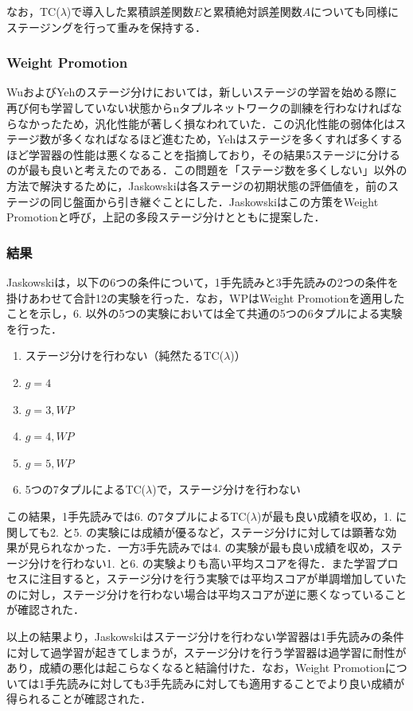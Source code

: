 \documentclass{suribt}
\begin{document}
なお，TC(${\lambda}$)で導入した累積誤差関数$E$と累積絶対誤差関数$A$についても同様にステージングを行って重みを保持する．

\subsubsection{Weight Promotion}
WuおよびYehのステージ分けにおいては，新しいステージの学習を始める際に再び何も学習していない状態からnタプルネットワークの訓練を行わなければならなかったため，汎化性能が著しく損なわれていた．この汎化性能の弱体化はステージ数が多くなればなるほど進むため，Yehはステージを多くすれば多くするほど学習器の性能は悪くなることを指摘しており，その結果5ステージに分けるのが最も良いと考えたのである．この問題を「ステージ数を多くしない」以外の方法で解決するために，Jaskowskiは各ステージの初期状態の評価値を，前のステージの同じ盤面から引き継ぐことにした．Jaskowskiはこの方策をWeight Promotionと呼び，上記の多段ステージ分けとともに提案した．

\subsubsection{結果}
Jaskowskiは，以下の6つの条件について，1手先読みと3手先読みの2つの条件を掛けあわせて合計12の実験を行った．なお，WPはWeight Promotionを適用したことを示し，6. 以外の5つの実験においては全て共通の5つの6タプルによる実験を行った．

\begin{enumerate}
\item ステージ分けを行わない（純然たるTC(${\lambda}$)）
\item $g=4$
\item $g=3, WP$
\item $g=4, WP$
\item $g=5, WP$
\item 5つの7タプルによるTC(${\lambda}$)で，ステージ分けを行わない
\end{enumerate}

この結果，1手先読みでは6. の7タプルによるTC(${\lambda}$)が最も良い成績を収め，1. に関しても2. と5. の実験には成績が優るなど，ステージ分けに対しては顕著な効果が見られなかった．一方3手先読みでは4. の実験が最も良い成績を収め，ステージ分けを行わない1. と6. の実験よりも高い平均スコアを得た．また学習プロセスに注目すると，ステージ分けを行う実験では平均スコアが単調増加していたのに対し，ステージ分けを行わない場合は平均スコアが逆に悪くなっていることが確認された．

以上の結果より，Jaskowskiはステージ分けを行わない学習器は1手先読みの条件に対して過学習が起きてしまうが，ステージ分けを行う学習器は過学習に耐性があり，成績の悪化は起こらなくなると結論付けた．なお，Weight Promotionについては1手先読みに対しても3手先読みに対しても適用することでより良い成績が得られることが確認された．
\end{document}
